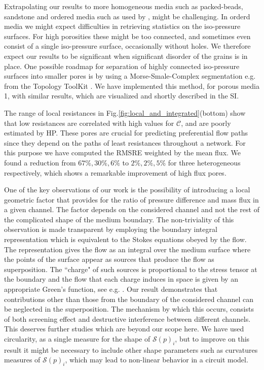 \documentclass[draft]{agujournal2019}
\begin{document}
Extrapolating our results to more homogeneous media such as packed-beads, sandstone and ordered media such as used by \cite{alim_local_2017}, might be challenging. In orderd media we might expect difficulties in retrieving statistics on the iso-pressure surfaces. For high porosities these might be too connected, and sometimes even consist of a single iso-pressure surface, occasionally without holes. We therefore expect our results to be significant when significant disorder of the grains is in place. One possible roadmap for separation of highly connected iso-pressure surfaces into smaller pores is by using a Morse-Smale-Complex segmentation e.g. from the Topology ToolKit \cite{tierny_topology_2018}. We have implemented this method, for porous media 1, with similar results, which are visualized and shortly described in the SI. 

The range of local resistances in Fig.\ref{fig:local_and_integrated}(bottom) show that low resistances are correlated with high values for $\mathcal{C}$, and are poorly estimated by HP. These pores are crucial for predicting preferential flow paths since they depend on the paths of least resistances throughout a network. For this purpose we have computed the RMSRE weighted by the mean flux. We found a reduction from $67\%, 30\%, 6\%$ to $2\%, 2\%,5\%$ for three heterogeneous respectively, which shows a remarkable improvement of high flux pores.  

One of the key observations of our work is the possibility of introducing a local geometric factor that provides for the ratio of pressure difference and mass flux in a given channel. The factor depends on the considered channel and not the rest of the complicated shape of the medium boundary. The non-triviality of this observation is made transparent by employing the boundary integral representation which is equivalent to the Stokes equations obeyed by the flow. The representation gives the flow as an integral over the medium surface where the points of the surface appear as sources that produce the flow as superposition. The ``charge" of such sources is proportional to the stress tensor at the boundary and the flow that each charge induces in space is given by an appropriate Green's function, see e.g. \cite{pozrikidis_boundary_1992}. Our result demonstrates that contributions other than those from the boundary of the considered channel can be neglected in the superposition. The mechanism by which this occurs, consists of both screening effect and destructive interference between different channels. This deserves further studies which are beyond our scope here. We have used circularity, as a single measure for the shape of $\mathcal{S}(p)_i$, but to improve on this result it might be necessary to include other shape parameters such as curvatures measures of $\mathcal{S}(p)_i$, which may lead to non-linear behavior in a circuit model. 
\end{document}
